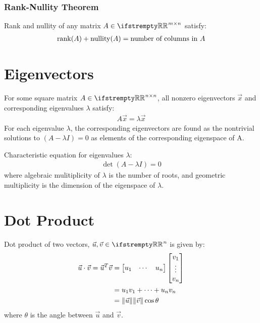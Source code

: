 \documentclass[12pt, a4paper]{article}
\begin{document}
\begin{multicols*}{3}
\subsubsection{Rank-Nullity Theorem}
Rank and nullity of any matrix $A \in \RR^{m{\times}n}$ satisfy:
\begin{align*}
  \operatorname{rank}(A) + \operatorname{nullity}(A) = \text{number of columns in }A
\end{align*}

\colbreak

\section{Eigenvectors}

For some square matrix $A \in \RR^{n{\times}n}$, all nonzero eigenvectors $\vec{x}$ and corresponding eigenvalues $\lambda$ satisfy:
\begin{align*}
  A \vec{x} = \lambda \vec{x}
\end{align*}
For each eigenvalue $\lambda$, the corresponding eigenvectors are found as the nontrivial solutions to $(A - \lambda I) = 0$ as elements of the corresponding eigenspace of A.

Characteristic equation for eigenvalues $\lambda$:
\begin{align*}
  \det(A - \lambda I) = 0
\end{align*}
where algebraic mulitiplicity of $\lambda$ is the number of roots, and geometric multiplicity is the dimension of the eigenspace of $\lambda$.

\section{Dot Product}

Dot product of two vectors, $\vec{u}, \vec{v} \in \RR^n$ is given by:
\begin{align*}
  \vec{u} \cdot \vec{v} = \vec{u}^T \vec{v}
                    &= \begin{bmatrix}u_1 & \cdots & u_n\end{bmatrix} \begin{bmatrix}v_1 \\ \vdots \\ v_n\end{bmatrix}\\
                    &= u_1v_1 + \cdots + u_nv_n \\
                    &= \lVert\vec{u}\rVert\lVert\vec{v}\rVert\cos\theta
\end{align*}
where $\theta$ is the angle between $\vec{u}$ and $\vec{v}$.


\end{multicols*}
\end{document}
